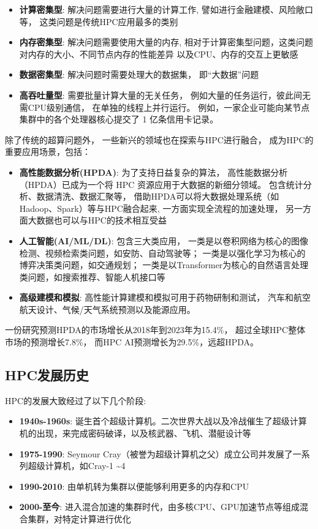 \begin{itemize}
    \item \textbf{计算密集型}: 解决问题需要进行大量的计算工作,
    譬如进行金融建模、风险敞口等，
    这类问题是传统HPC应用最多的类别
    \item \textbf{内存密集型}: 解决问题需要使用大量的内存,
    相对于计算密集型问题，这类问题对内存的大小、不同节点内存的性能差异
    以及CPU、内存的交互上更敏感
    \item \textbf{数据密集型}: 解决问题时需要处理大的数据集，
    即“大数据”问题
    \item \textbf{高吞吐量型}: 需要批量计算大量的无关任务，
    例如大量的任务运行，彼此间无需CPU级别通信，
    在单独的线程上并行运行。
    例如，一家企业可能向某节点集群中的各个处理器核心提交了 1 亿条信用卡记录\cite{oracle_hpc}。
\end{itemize}

除了传统的超算问题外，
一些新兴的领域也在探索与HPC进行融合，
成为HPC的重要应用场景，包括：
\begin{itemize}
    \item \textbf{高性能数据分析(HPDA)}: 为了支持日益复杂的算法，
    高性能数据分析（HPDA）已成为一个将 HPC 资源应用于大数据的新细分领域。
    包含统计分析、数据清洗、数据汇聚等，
    借助HPDA可以将大数据处理系统（如Hadoop、Spark）等与HPC融合起来,
    一方面实现全流程的加速处理，
    另一方面大数据也可以与HPC的技术相互受益\cite{hpda,yef2022_hpc}
    \item \textbf{人工智能(AI/ML/DL)}: 包含三大类应用，
    一类是以卷积网络为核心的图像检测、视频检索类问题，如安防、自动驾驶等；
    一类是以强化学习为核心的博弈决策类问题，如交通规划；
    一类是以Transformer为核心的自然语言处理类问题，如搜索推荐、智能人机接口等\cite{yef2022_hpc}
    \item \textbf{高级建模和模拟}: 高性能计算建模和模拟可用于药物研制和测试，
    汽车和航空航天设计、气候/天气系统预测以及能源应用\cite{amd_hpc}。
\end{itemize}

一份研究预测HPDA的市场增长从2018年到2023年为15.4\%，
超过全球HPC整体市场的预测增长7.8\%，
而HPC AI预测增长为29.5\%，远超HPDA\cite{hpc_rearch_2019}。

\subsection{HPC发展历史}

HPC的发展大致经过了以下几个阶段\cite{hpc_history}:

\begin{itemize}
    \item \textbf{1940s-1960s}: 诞生首个超级计算机。二次世界大战以及冷战催生了超级计算机的出现，来完成密码破译，以及核武器、飞机、潜艇设计等
    \item \textbf{1975-1990}: Seymour Cray（被誉为超级计算机之父）成立公司并发展了一系列超级计算机，如Cray-1 \textasciitilde 4
    \item \textbf{1990-2010}: 由单机转为集群以便能够利用更多的内存和CPU
    \item \textbf{2000-至今}: 进入混合加速的集群时代，由多核CPU、GPU加速节点等组成混合集群，对特定计算进行优化
\end{itemize}

